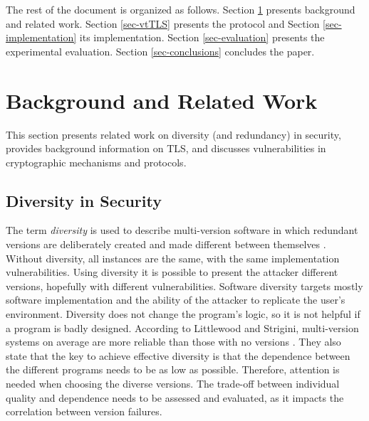 \documentclass{sig-alternate-05-2015}
\begin{document}
The rest of the document is organized as follows. Section \ref{sec-related-work} presents background and related work. Section \ref{sec-vtTLS} presents the protocol and Section \ref{sec-implementation} its implementation. Section \ref{sec-evaluation} presents the experimental evaluation. Section \ref{sec-conclusions} concludes the paper.


\section{Background and Related Work}
\label{sec-related-work}


This section presents related work on diversity (and redundancy) in security, provides background information on TLS, and discusses vulnerabilities in cryptographic mechanisms and protocols.

\subsection{Diversity in Security}

The term \textit{diversity} is used to describe multi-version software in which redundant versions are deliberately created and made different between themselves \cite{Littlewood2004}.
Without diversity, all instances are the same, with the same implementation vulnerabilities. Using diversity it is possible to present the attacker different versions, hopefully with different vulnerabilities. %
%
Software diversity targets mostly software implementation and the ability of the attacker to replicate the user's environment. 
Diversity does not change the program's logic, so it is not  helpful if a program is badly designed.
%
According to Littlewood and Strigini, multi-version systems on average are more reliable than those with no versions \cite{Littlewood2004}. They  also state that the key to achieve effective diversity is that the dependence between the different programs needs to be as low as possible. %
%
Therefore, attention is needed when choosing the diverse versions. The trade-off between individual quality and  dependence needs to be assessed and evaluated, as it impacts the correlation between version failures.
\end{document}

